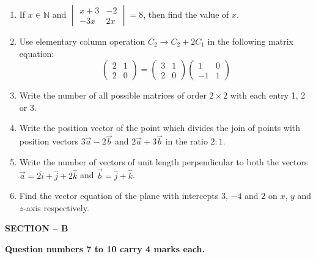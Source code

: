 \documentclass[12pt,a4paper]{article}
\begin{document}
\begin{enumerate}[label=\textbf{\arabic*.}, leftmargin=*, itemsep=1.2em]

\item If $x \in \mathbb{N}$ and
$\begin{vmatrix} x+3 & -2 \\ -3x & 2x \end{vmatrix} = 8$,
then find the value of $x$.

\item Use elementary column operation $C_2 \to C_2 + 2C_1$ in the following matrix equation:
\[
\begin{pmatrix} 2 & 1 \\ 2 & 0 \end{pmatrix}
=
\begin{pmatrix} 3 & 1 \\ 2 & 0 \end{pmatrix}
\begin{pmatrix} 1 & 0 \\ -1 & 1 \end{pmatrix}
\]

\item Write the number of all possible matrices of order $2 \times 2$ with each entry 1, 2 or 3.

\item Write the position vector of the point which divides the join of points with position vectors $3\vec{a} - 2\vec{b}$ and $2\vec{a} + 3\vec{b}$ in the ratio $2:1$.

\item Write the number of vectors of unit length perpendicular to both the vectors
$\vec{a} = 2\hat{i} + \hat{j} + 2\hat{k}$ and $\vec{b} = \hat{j} + \hat{k}$.

\item Find the vector equation of the plane with intercepts 3, $-4$ and 2 on $x$, $y$ and $z$-axis respectively.

\end{enumerate}

\vspace{0.6cm}

\begin{center}
  \textbf{SECTION -- B}
\end{center}

\begin{center}
  \textbf{Question numbers 7 to 10 carry 4 marks each.}
\end{center}

\vspace{0.3cm}
\end{document}
